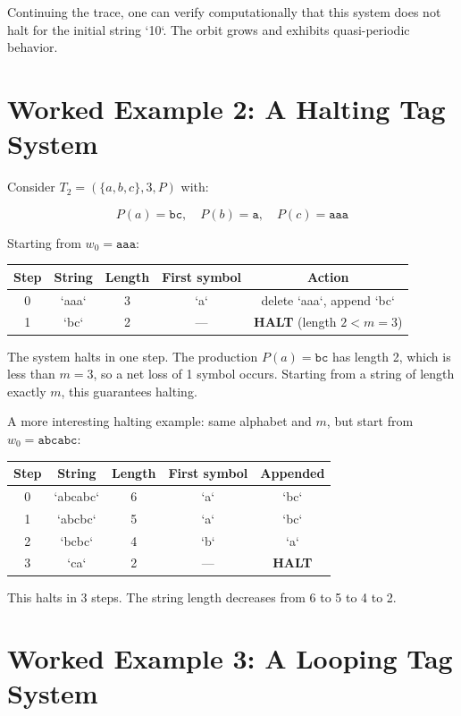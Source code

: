 Continuing the trace, one can verify computationally that this system does not halt for the initial string `10`. The orbit grows and exhibits quasi-periodic behavior.

\section{Worked Example 2: A Halting Tag System}

Consider $T_2 = (\{ a, b, c\} , 3, P)$ with:

\[P(a) = \texttt{bc}, \quad P(b) = \texttt{a}, \quad P(c) = \texttt{aaa}\]

Starting from $w_0 = \texttt{aaa}$:

\begin{center}
\begin{tabular}{ccccc}
\toprule
Step & String & Length & First symbol & Action \\
\midrule
0 & `aaa` & 3 & `a` & delete `aaa`, append `bc` \\
1 & `bc` & 2 & --- & \textbf{HALT} (length $2 < m = 3$) \\
\bottomrule
\end{tabular}
\end{center}

The system halts in one step. The production $P(a) = \texttt{bc}$ has length 2, which is less than $m = 3$, so a net loss of 1 symbol occurs. Starting from a string of length exactly $m$, this guarantees halting.

A more interesting halting example: same alphabet and $m$, but start from $w_0 = \texttt{abcabc}$:

\begin{center}
\begin{tabular}{ccccc}
\toprule
Step & String & Length & First symbol & Appended \\
\midrule
0 & `abcabc` & 6 & `a` & `bc` \\
1 & `abcbc` & 5 & `a` & `bc` \\
2 & `bcbc` & 4 & `b` & `a` \\
3 & `ca` & 2 & --- & \textbf{HALT} \\
\bottomrule
\end{tabular}
\end{center}

This halts in 3 steps. The string length decreases from 6 to 5 to 4 to 2.

\section{Worked Example 3: A Looping Tag System}

